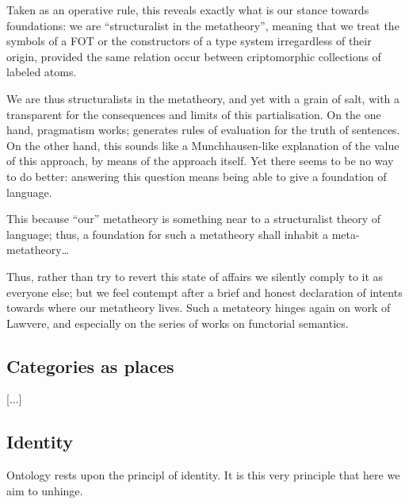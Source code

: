 \documentclass{amsart}
\begin{document}
Taken as an operative rule, this reveals exactly what is our stance towards foundations: we are ``structuralist in the metatheory'', meaning that we treat the symbols of a FOT or the constructors of a type system irregardless of their origin, provided the same relation occur between criptomorphic collections of labeled atoms.

We are thus structuralists in the metatheory, and yet with a grain of salt, with a transparent for the consequences and limits of this partialisation. On the one hand, pragmatism works; generates rules of evaluation for the truth of sentences. On the other hand, this sounds like a Munchhausen-like explanation of the value of this approach, by means of the approach itself. Yet there seems to be no way to do better: answering this question means being able to give a foundation of language.

This because ``our'' metatheory is something near to a structuralist theory of language; thus, a foundation for such a metatheory shall inhabit a meta-metatheory\dots 


Thus, rather than try to revert this state of affairs we silently comply to it as everyone else; but we feel contempt after a brief and honest declaration of intents towards where our metatheory lives. Such a metateory hinges again on work of Lawvere, and especially on the series of works on functorial semantics.
\subsection{Categories as places}
[...]
\subsection{Identity}
Ontology rests upon the principl of identity. It is this very principle that here we aim to unhinge.
\end{document}
